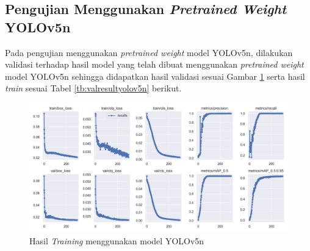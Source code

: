 
\subsection{Pengujian Menggunakan \textit{Pretrained Weight} YOLOv5n}
\label{subsec:pengujianyolov5n}

Pada pengujian menggunakan \textit{pretrained weight} model YOLOv5n, dilakukan validasi terhadap hasil model yang telah dibuat menggunakan \textit{pretrained weight} model YOLOv5n sehingga didapatkan hasil validasi sesuai Gambar \ref*{fig:trainresultyolov5n} serta hasil \textit{train} sesuai Tabel \ref*{tb:valresultyolov5n} berikut. \par

\begin{figure}[H]
  \centering
  \includegraphics[scale=0.5]{gambar/yolov5n/train_results.png}
  \caption{Hasil \textit{Training} menggunakan model YOLOv5n}
  \label{fig:trainresultyolov5n}
\end{figure}

